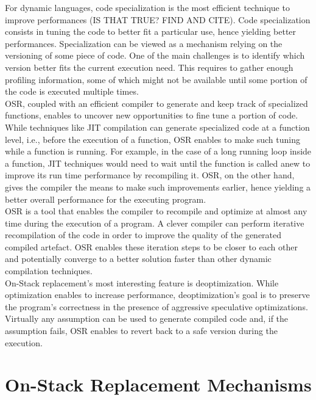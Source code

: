 For dynamic languages, code specialization is the most efficient technique to improve performances (IS THAT TRUE? FIND AND CITE).
Code specialization consists in tuning the code to better fit a particular use, hence yielding better performances.
Specialization can be viewed as a mechanism relying on the versioning of some piece of code.
One of the main challenges is to identify which version better fits the current execution need.
This requires to gather enough profiling information, some of which might not be available until some portion of the code is executed multiple times.\\

OSR, coupled with an efficient compiler to generate and keep track of specialized functions, enables to uncover new opportunities to fine tune a portion of code.
While techniques like JIT compilation can generate specialized code at a function level, i.e., before the execution of a function, OSR enables to make such tuning while a function is running.
For example, in the case of a long running loop inside a function, JIT techniques would need to wait until the function is called anew to improve its run time performance by recompiling it. 
OSR, on the other hand, gives the compiler the means to make such improvements earlier, hence yielding a better overall performance for the executing program.\\

OSR is a tool that enables the compiler to recompile and optimize at almost any time during the execution of a program.
A clever compiler can perform iterative recompilation of the code in order to improve the quality of the generated compiled artefact.
OSR enables these iteration steps to be closer to each other and potentially converge to a better solution faster than other dynamic compilation techniques.\\

On-Stack replacement's most interesting feature is deoptimization. 
While optimization enables to increase performance, deoptimization's goal is to preserve the program's correctness in the presence of aggressive speculative optimizations. 
Virtually any assumption can be used to generate compiled code and, if the assumption fails, 
OSR enables to revert back to a safe version during the execution.\\

\section{On-Stack Replacement Mechanisms}

